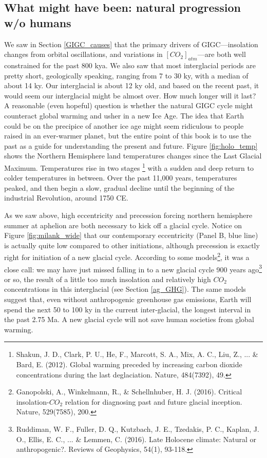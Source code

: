 \subsection{What might have been: natural progression w/o humans}
We saw in Section \ref{GIGC_causes} that the primary drivers of GIGC---insolation changes from orbital oscillations, and variations in $[CO_2]_{atm}$---are both well constrained for the past 800 kya. We also saw that most interglacial periods are pretty short, geologically speaking, ranging from 7 to 30 ky, with a median of about 14 ky. Our interglacial is about 12 ky old, and based on the recent past, it would seem our interglacial might be almost over. How much longer will it last? A reasonable (even hopeful) question is whether the natural GIGC cycle might counteract global warming and usher in a new Ice Age. The idea that Earth could be on the precipice of another ice age might seem ridiculous to people raised in an ever-warmer planet, but the entire point of this book is to use the past as a guide for understanding the present and future. Figure \ref{fig:holo_temp} shows the Northern Hemisphere land temperatures changes since the Last Glacial Maximum. Temperatures rise in two stages \footnote{Shakun, J. D., Clark, P. U., He, F., Marcott, S. A., Mix, A. C., Liu, Z., ... \& Bard, E. (2012). Global warming preceded by increasing carbon dioxide concentrations during the last deglaciation. Nature, 484(7392), 49.} with a sudden and deep return to colder temperatures in between. Over the past 11,000 years, temperatures peaked, and then begin a slow, gradual decline until the beginning of the industrial Revolution, around 1750 CE.

As we saw above, high eccentricity and precession forcing northern hemisphere summer at aphelion are both necessary to kick off a glacial cycle. Notice on Figure \ref{fig:milank_wide} that our contemporary eccentricity (Panel B, blue line) is actually quite low compared to other initiations, although precession is exactly right for initiation of a new glacial cycle. According to some models\footnote{Ganopolski, A., Winkelmann, R., \& Schellnhuber, H. J. (2016). Critical insolation-$CO_2$ relation for diagnosing past and future glacial inception. Nature, 529(7585), 200.}, it was a close call: we may have just missed falling in to a new glacial cycle 900 years ago\footnote{Ruddiman, W. F., Fuller, D. Q., Kutzbach, J. E., Tzedakis, P. C., Kaplan, J. O., Ellis, E. C., ... \& Lemmen, C. (2016). Late Holocene climate: Natural or anthropogenic?. Reviews of Geophysics, 54(1), 93-118.} or so, the result of a little too much insolation and relatively high $CO_2$ concentrations in this interglacial (see Section \ref{ag_GHG}). The same models suggest that, even without anthropogenic greenhouse gas emissions, Earth will spend the next 50 to 100 ky in the current inter-glacial, the longest interval in the past 2.75 Ma. A new glacial cycle will not save human societies from global warming.          
